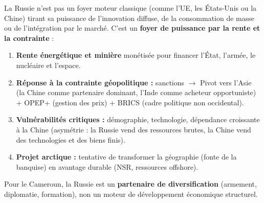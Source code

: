 \documentclass[11pt]{article}
\begin{document}
\begin{aretenir}
La Russie n'est pas un foyer moteur classique (comme l'UE, les États-Unis ou la Chine) tirant sa puissance de l'innovation diffuse, de la consommation de masse ou de l'intégration par le marché. C'est un \textbf{foyer de puissance par la rente et la contrainte} :
\begin{enumerate}
    \item \textbf{Rente énergétique et minière} monétisée pour financer l'État, l'armée, le nucléaire et l'espace.
    \item \textbf{Réponse à la contrainte géopolitique :} sanctions $\rightarrow$ Pivot vers l'Asie (la Chine comme partenaire dominant, l'Inde comme acheteur opportuniste) + OPEP+ (gestion des prix) + BRICS (cadre politique non occidental).
    \item \textbf{Vulnérabilités critiques :} démographie, technologie, dépendance croissante à la Chine (asymétrie : la Russie vend des ressources brutes, la Chine vend des technologies et des biens finis).
    \item \textbf{Projet arctique :} tentative de transformer la géographie (fonte de la banquise) en avantage durable (NSR, ressources offshore).
\end{enumerate}
Pour le Cameroun, la Russie est un \textbf{partenaire de diversification} (armement, diplomatie, formation), non un moteur de développement économique structurel.
\end{aretenir}
\end{document}
